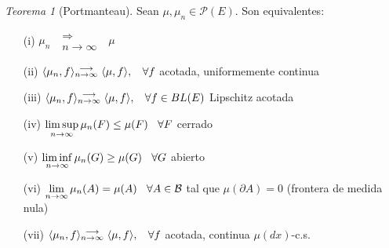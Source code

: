 \documentclass[letterpaper,11pt]{article} %
\def\espacio{\hspace{.25cm}\,}
\theoremstyle{defbreak}
\theoremstyle{propbreak}
\theoremstyle{remark}
\theoremstyle{break}
\newtheorem{theorem}{Teorema}[subsection]
\begin{document}
\begin{theorem}[Portmanteau] Sean $\mu,\mu_n \in \mathcal{P}(E)$. Son equivalentes:
\label{portmanteau}
\begin{enumerate}
    \item[(i)] $\mu_n \mbox{ }\substack{\Longrightarrow \\n \to \infty}\mbox{ } \mu$
    \item[(ii)] $\langle \mu_n,f\rangle { }\substack{\longrightarrow \\ n\to\infty}\mbox{ } \langle \mu,f\rangle, \hspace{.25cm}\, \forall f$ acotada, uniformemente continua
    \item[(iii)]$\langle \mu_n,f\rangle { }\substack{\longrightarrow \\ n\to\infty}\mbox{ } \langle \mu,f\rangle, \espacio \forall f \in BL(E)$ Lipschitz acotada
    \item[(iv)] $\displaystyle\limsup_{n\to\infty} \mu_n (F)\leq\mu(F) \espacio \forall F $ cerrado
    \item[(v)] $\displaystyle\liminf_{n\to\infty} \mu_n (G)\geq\mu(G) \espacio \forall G $ abierto
    \item[(vi)] $\displaystyle\lim_{n\to\infty}\mu_n(A) = \mu(A) \espacio \forall A \in \mathcal{B}$ tal que $\mu(\partial A)=0$ (frontera de medida nula)
    \item[(vii)] $\langle \mu_n,f\rangle { }\substack{\longrightarrow \\ n\to\infty}\mbox{ } \langle \mu,f\rangle, \espacio \forall f$ acotada, continua $\mu(dx)$-c.s.
\end{enumerate}
\end{theorem}
\end{document}
